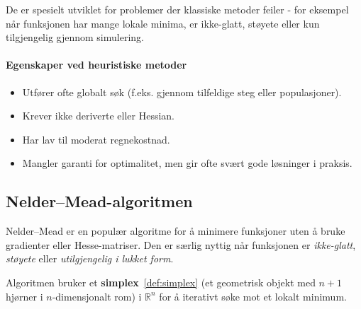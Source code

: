 De er spesielt utviklet for problemer der klassiske metoder feiler - for eksempel når funksjonen har mange lokale minima, er ikke-glatt, støyete eller kun tilgjengelig gjennom simulering.

\paragraph{Egenskaper ved heuristiske metoder}

\begin{itemize}
	\item Utfører ofte globalt søk (f.eks. gjennom tilfeldige steg eller populasjoner).
	\item Krever ikke deriverte eller Hessian.
	\item Har lav til moderat regnekostnad.
	\item Mangler garanti for optimalitet, men gir ofte svært gode løsninger i praksis.
\end{itemize}

\subsection{Nelder--Mead-algoritmen}
\label{sec:nelder_mead}

Nelder--Mead er en populær algoritme  for å minimere funksjoner uten å bruke gradienter eller Hesse-matriser.
Den er særlig nyttig når funksjonen er \emph{ikke-glatt}, \emph{støyete} eller \emph{utilgjengelig i lukket form}.

Algoritmen bruker et \textbf{simplex}~\ref{def:simplex} (et geometrisk objekt med \( n+1 \) hjørner i \( n \)-dimensjonalt rom) i \( \mathbb{R}^n \) for å iterativt søke mot et lokalt minimum.

